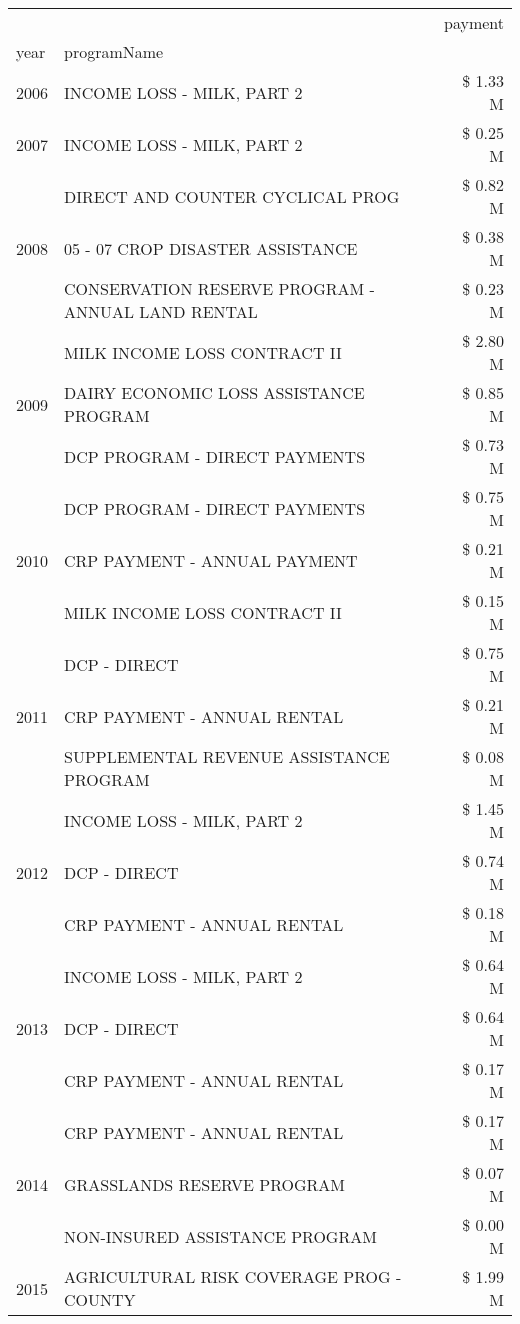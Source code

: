 \begin{tabular}{llr}
\toprule
 &  & payment \\
year & programName &  \\
\midrule
2006 & INCOME LOSS - MILK, PART 2 & \$ 1.33 M \\
\cline{1-3}
2007 & INCOME LOSS - MILK, PART 2 & \$ 0.25 M \\
\cline{1-3}
\multirow[t]{3}{*}{2008} & DIRECT AND COUNTER CYCLICAL PROG & \$ 0.82 M \\
 & 05 - 07 CROP DISASTER ASSISTANCE & \$ 0.38 M \\
 & CONSERVATION RESERVE PROGRAM - ANNUAL LAND RENTAL & \$ 0.23 M \\
\cline{1-3}
\multirow[t]{3}{*}{2009} & MILK INCOME LOSS CONTRACT II & \$ 2.80 M \\
 & DAIRY ECONOMIC LOSS ASSISTANCE PROGRAM & \$ 0.85 M \\
 & DCP PROGRAM - DIRECT PAYMENTS & \$ 0.73 M \\
\cline{1-3}
\multirow[t]{3}{*}{2010} & DCP PROGRAM - DIRECT PAYMENTS & \$ 0.75 M \\
 & CRP PAYMENT - ANNUAL PAYMENT & \$ 0.21 M \\
 & MILK INCOME LOSS CONTRACT II & \$ 0.15 M \\
\cline{1-3}
\multirow[t]{3}{*}{2011} & DCP - DIRECT & \$ 0.75 M \\
 & CRP PAYMENT - ANNUAL RENTAL & \$ 0.21 M \\
 & SUPPLEMENTAL REVENUE ASSISTANCE PROGRAM & \$ 0.08 M \\
\cline{1-3}
\multirow[t]{3}{*}{2012} & INCOME LOSS - MILK, PART 2 & \$ 1.45 M \\
 & DCP - DIRECT & \$ 0.74 M \\
 & CRP PAYMENT - ANNUAL RENTAL & \$ 0.18 M \\
\cline{1-3}
\multirow[t]{3}{*}{2013} & INCOME LOSS - MILK, PART 2 & \$ 0.64 M \\
 & DCP - DIRECT & \$ 0.64 M \\
 & CRP PAYMENT - ANNUAL RENTAL & \$ 0.17 M \\
\cline{1-3}
\multirow[t]{3}{*}{2014} & CRP PAYMENT - ANNUAL RENTAL & \$ 0.17 M \\
 & GRASSLANDS RESERVE PROGRAM & \$ 0.07 M \\
 & NON-INSURED ASSISTANCE PROGRAM & \$ 0.00 M \\
\cline{1-3}
\multirow[t]{3}{*}{2015} & AGRICULTURAL RISK COVERAGE PROG - COUNTY & \$ 1.99 M \\

\end{tabular}
